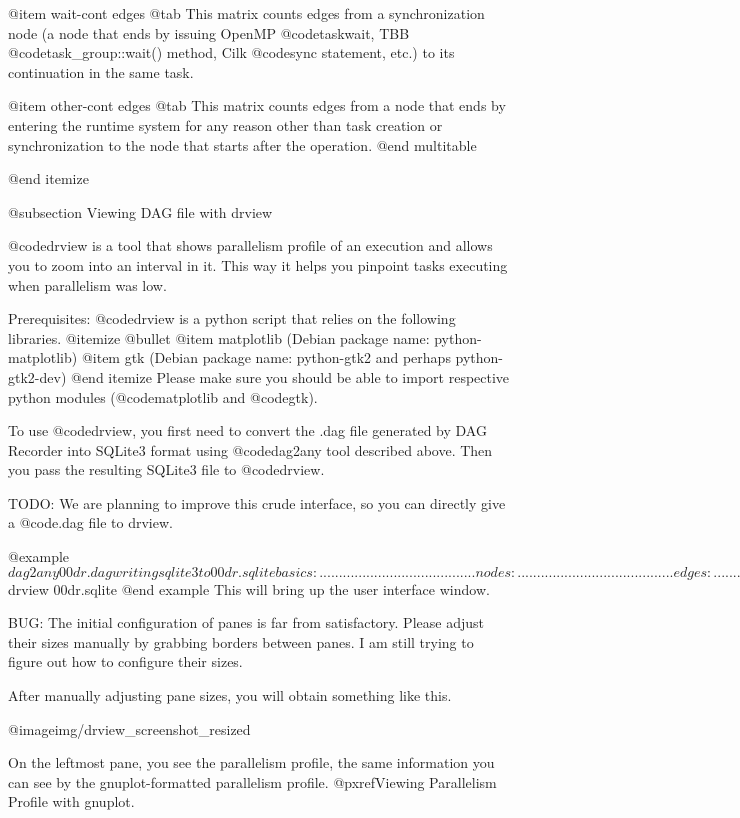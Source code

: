 @item wait-cont edges @tab 
This matrix counts edges from
a synchronization node (a node that ends by issuing OpenMP 
@code{taskwait},
TBB @code{task_group::wait()} method, 
Cilk @code{sync} statement, etc.) to its continuation in 
the same task.

@item other-cont edges @tab
This matrix counts edges from
a node that ends by entering the runtime system for any reason other
than task creation or synchronization to the node that starts after the
operation.
@end multitable

@end itemize

@subsection Viewing DAG file with drview

@code{drview} is a tool that shows parallelism profile of an execution
and allows you to zoom into an interval in it.  This way it helps you
pinpoint tasks executing when parallelism was low.

Prerequisites:  @code{drview} is a python script that 
relies on the following libraries.
@itemize @bullet
@item matplotlib (Debian package name: python-matplotlib)
@item gtk (Debian package name: python-gtk2 and perhaps python-gtk2-dev)
@end itemize
Please make sure you should be able to import respective python modules
(@code{matplotlib} and @code{gtk}).

To use @code{drview}, you first need to convert the .dag file 
generated by DAG Recorder into
SQLite3 format using @code{dag2any} tool described above.  
Then you pass the resulting
SQLite3 file to @code{drview}.

TODO: We are planning to improve this crude interface, so you can
directly give a @code{.dag} file to drview.

@example
$ dag2any 00dr.dag 
writing sqlite3 to 00dr.sqlite
basics:  ........................................
nodes:   ........................................
edges:   ........................................
strings: ........................................
committing
$ drview 00dr.sqlite
@end example
This will bring up the user interface window.

BUG: The initial configuration of panes is far from satisfactory.
Please adjust their sizes manually by grabbing borders between panes.  I
am still trying to figure out how to configure their sizes.

After manually adjusting pane sizes, you will obtain something like this.

@image{img/drview_screenshot_resized}

On the leftmost pane, you see the parallelism profile, the same
information you can see by the gnuplot-formatted parallelism profile.
@pxref{Viewing Parallelism Profile with gnuplot}. 

